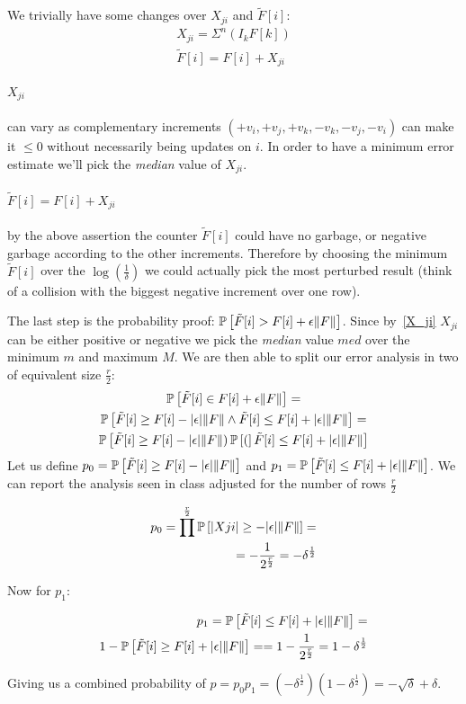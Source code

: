 We trivially have some changes over $X_{ji}$ and $\tilde{F}[i]$:
    \begin{gather*}
        X_{ji} = \Sigma^{n}(I_k F[k]) \\
        \tilde{F}[i] = F[i] + X_{ji}
    \end{gather*}
\label{X_ji}\paragraph{$X_{ji}$} can vary as complementary increments $(+v_i, +v_j, +v_k, -v_k, -v_j, -v_i)$
can make it $\leq 0$ without necessarily being updates on $i$.
In order to have a minimum error estimate we'll pick the \emph{median} value of $X_{ji}$.
\label{f_tilde}~\paragraph{$\tilde{F}[i] = F[i] + X_{ji}$} by the above assertion the counter $\tilde{F}[i]$ could have no garbage, or negative
garbage according to the other increments.
Therefore by choosing the minimum $\tilde{F}[i]$ over the $\log(\frac{1}{\delta})$ we
could actually pick the most perturbed result (think of a collision with the
biggest negative increment over one row).

\label{probability}The last step is the probability proof: $\operatorname*{\mathbb{P}}\left[{\tilde{F}[i] > F[i] + \epsilon \lVert F\rVert}\right]$.
Since by~\ref{X_ji} $X_{ji}$ can be either positive or negative we pick the \emph{median}
value $med$ over the minimum $m$ and maximum $M$.
We are then able to split our error analysis in two of equivalent size $\frac{r}{2}$:
\begin{gather*}
\operatorname*{\mathbb{P}}\left[{\tilde{F}[i] \in F[i] + \epsilon \lVert F\rVert}\right] = \\
\operatorname*{\mathbb{P}}\left[{\tilde{F}[i] \geq F[i] - \lvert\epsilon\rvert \lVert F\rVert \wedge \tilde{F}[i] \leq F[i] + \lvert\epsilon\rvert \lVert F\rVert}\right] = \\
\operatorname*{\mathbb{P}}\left[{\tilde{F}[i] \geq F[i] - \lvert\epsilon\rvert \lVert F\rVert) \operatorname*{\mathbb{P}}\left[{(}\right]\tilde{F}[i] \leq F[i] + \lvert\epsilon\rvert \lVert F\rVert}\right]
\end{gather*}
Let us define $p_0 = \operatorname*{\mathbb{P}}\left[{\tilde{F}[i] \geq F[i] - \lvert\epsilon\rvert \lVert F\rVert}\right]$ and
$p_1 = \operatorname*{\mathbb{P}}\left[{\tilde{F}[i] \leq F[i] + \lvert\epsilon\rvert \lVert F\rVert}\right]$.
We can report the analysis seen in class adjusted for the number of rows $\frac{r}{2}$

\begin{align*}
p_0 = \prod^{\frac{r}{2}}\operatorname*{\mathbb{P}}\left[{|Xji| \geq - \lvert\epsilon\rvert \lVert F\rVert}\right] = \\
    = - \frac{1}{2^{\frac{r}{2}}} = - \delta^{\frac{1}{2}}
\end{align*}

Now for $p_1$:

\begin{align*}
    p_1 = \operatorname*{\mathbb{P}}\left[{\tilde{F}[i] \leq F[i] + \lvert\epsilon\rvert \lVert F\rVert}\right] = \\
    1 - \operatorname*{\mathbb{P}}\left[{\tilde{F}[i] \geq F[i] + \lvert\epsilon\rvert \lVert F\rVert}\right] =
    = 1 - \frac{1}{2^{\frac{r}{2}}} = 1 - \delta^{\frac{1}{2}}
\end{align*}

Giving us a combined probability of $p = p_0 p_1 =
(- \delta^{\frac{1}{2}}) (1 - \delta^{\frac{1}{2}}) = -\sqrt{\delta} + \delta$.
